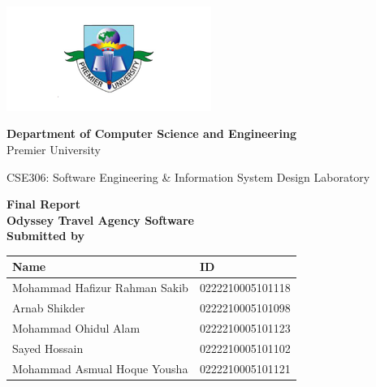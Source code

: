 \documentclass{scrreprt}
\renewcommand{\arraystretch}{1.5}
\begin{document}
\begin{titlepage}
    \centering
    \begin{center}
        \includegraphics[width=0.5\textwidth]{./logo.png} %
    \end{center}
\begin{center}
    \textbf{Department of Computer Science and Engineering}\\
    Premier University
\end{center}
\begin{center}
    \textnormal{ CSE306: Software Engineering \& Information System Design Laboratory }
\end{center}
    \huge
    \textbf{Final Report}\\
    \vspace{0.5in}
    \LARGE
    \textbf{Odyssey Travel Agency Software}\\
    \vspace{1in}
    \large
    \textbf {Submitted by}\\
    \begin{center}
        \renewcommand{\arraystretch}{1.5} %
        \begin{tabular}{|>{\raggedright\arraybackslash}p{}|p{}|} %
        \hline
        \textbf{Name} & \textbf{ID} \\
        \hline
        Mohammad Hafizur Rahman Sakib & 0222210005101118 \\
        \hline
        Arnab Shikder & 0222210005101098 \\
        \hline
        Mohammad Ohidul Alam & 0222210005101123 \\
        \hline
        Sayed Hossain & 0222210005101102 \\
        \hline
        Mohammad Asmual Hoque Yousha & 0222210005101121 \\
        \hline
        \end{tabular}
        \end{center}
    \vspace{0.5in}
 

\end{titlepage}
\end{document}
